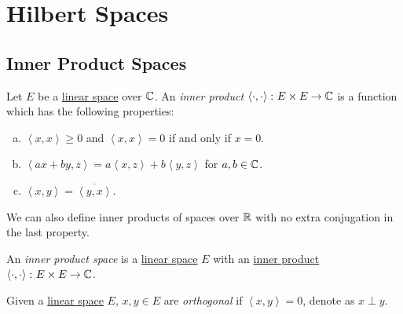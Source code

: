 \chapter{Hilbert Spaces}
\section{Inner Product Spaces}
\begin{definition}\label{def:inner-product}
	Let \(E\) be a \hyperref[def:linear-vector-space]{linear space} over \(\mathbb{\MakeUppercase{c}} \). An \emph{inner product} \(\left\langle \cdot, \cdot \right\rangle \colon E \times E \to \mathbb{\MakeUppercase{c}} \) is a function which has the following properties:
	\begin{enumerate}[(a)]
		\item \(\left\langle x, x \right\rangle \geq 0\) and \(\left\langle x, x \right\rangle = 0\) if and only if \(x = 0\).
		\item \(\left\langle ax + by, z \right\rangle = a\left\langle x, z \right\rangle + b \left\langle y, z \right\rangle  \) for \(a, b\in \mathbb{\MakeUppercase{c}} \).
		\item \(\left\langle x, y \right\rangle = \overline{\left\langle y, x \right\rangle }\).
	\end{enumerate}
\end{definition}

\begin{remark}
	We can also define inner products of spaces over \(\mathbb{\MakeUppercase{r}} \) with no extra conjugation in the last property.
\end{remark}

\begin{definition}\label{def:inner-product-space}
	An \emph{inner product space} is a \hyperref[def:linear-vector-space]{linear space} \(E\) with an \hyperref[def:inner-product]{inner product} \(\left\langle \cdot, \cdot \right\rangle \colon E\times E\to \mathbb{\MakeUppercase{c}} \).
\end{definition}
\begin{definition}[Orthogonal]\label{def:orthogonal}
	Given a \hyperref[def:linear-vector-space]{linear space} \(E\), \(x, y\in E\) are \emph{orthogonal} if \(\left\langle x, y \right\rangle = 0\), denote as \(x\perp y\).
\end{definition}

